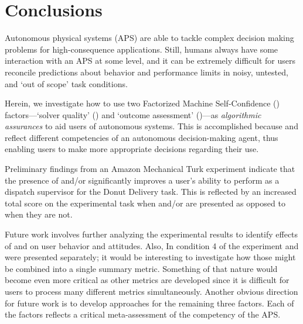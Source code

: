 \section{Conclusions} \label{sec:conclusions}
Autonomous physical systems (APS) are able to tackle complex decision making problems for high-consequence applications. Still, humans always have some interaction with an APS at some level, and it can be extremely difficult for users reconcile predictions about behavior and performance limits in noisy, untested, and `out of scope' task conditions.

Herein, we investigate how to use two Factorized Machine Self-Confidence (\famsec) factors---`solver quality' (\xQ{}) and `outcome assessment' (\xO)---as \emph{algorithmic assurances} to aid users of autonomous systems. This is accomplished because \xQ{} and \xO{} reflect different competencies of an autonomous decision-making agent, thus enabling users to make more appropriate decisions regarding their use.

Preliminary findings from an Amazon Mechanical Turk experiment indicate that the presence of \xQ{} and/or \xP{} significantly improves a user's ability to perform as a dispatch supervisor for the Donut Delivery task. This is reflected by an increased total score on the experimental task when \xQ{} and/or \xO{} are presented as opposed to when they are not.

Future work involves further analyzing the experimental results to identify effects of \xQ{} and \xP{} on user behavior and attitudes. Also, In condition 4 of the experiment \xQ{} and \xP{} were presented separately; it would be interesting to investigate how those might be combined into a single summary metric. Something of that nature would become even more critical as other \famsec{} metrics are developed since it is difficult for users to process many different metrics simultaneously. Another obvious direction for future work is to develop approaches for the remaining three \famsec{} factors. Each of the factors reflects a critical meta-assessment of the competency of the APS. 
